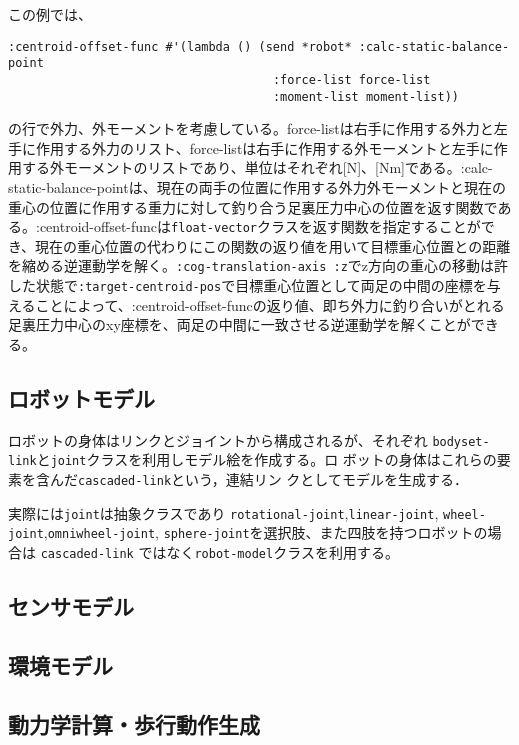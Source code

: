 この例では、
{\baselineskip=10pt
\begin{verbatim}
:centroid-offset-func #'(lambda () (send *robot* :calc-static-balance-point
                                     :force-list force-list
                                     :moment-list moment-list))
\end{verbatim}
}
の行で外力、外モーメントを考慮している。force-listは右手に作用する外力と左手に作用する外力のリスト、force-listは右手に作用する外モーメントと左手に作用する外モーメントのリストであり、単位はそれぞれ[N]、[Nm]である。:calc-static-balance-pointは、現在の両手の位置に作用する外力外モーメントと現在の重心の位置に作用する重力に対して釣り合う足裏圧力中心の位置を返す関数である。:centroid-offset-funcは\verb|float-vector|クラスを返す関数を指定することができ、現在の重心位置の代わりにこの関数の返り値を用いて目標重心位置との距離を縮める逆運動学を解く。\verb|:cog-translation-axis :z|でz方向の重心の移動は許した状態で\verb|:target-centroid-pos|で目標重心位置として両足の中間の座標を与えることによって、:centroid-offset-funcの返り値、即ち外力に釣り合いがとれる足裏圧力中心のxy座標を、両足の中間に一致させる逆運動学を解くことができる。

 \subsection{ロボットモデル}

ロボットの身体はリンクとジョイントから構成されるが、それぞれ
\verb|bodyset-link|と\verb|joint|クラスを利用しモデル絵を作成する。ロ
ボットの身体はこれらの要素を含んだ\verb|cascaded-link|という，連結リン
クとしてモデルを生成する．

実際には\verb|joint|は抽象クラスであり
\verb|rotational-joint|,\verb|linear-joint|,
\verb|wheel-joint|,\verb|omniwheel-joint|,
\verb|sphere-joint|を選択肢、また四肢を持つロボットの場合は
\verb|cascaded-link|
ではなく\verb|robot-model|クラスを利用する。

  
  
  
 \subsection{センサモデル}
  
 \subsection{環境モデル}
  
 \subsection{動力学計算・歩行動作生成}
